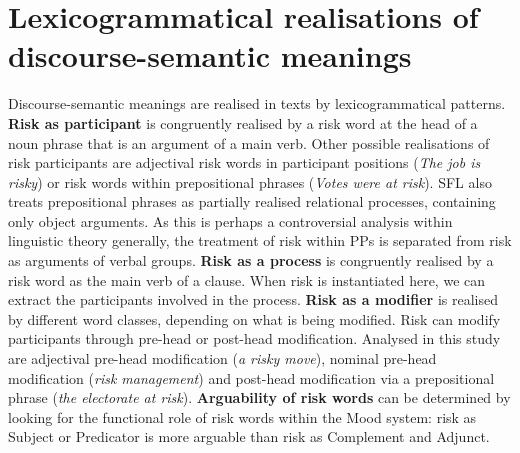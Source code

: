 		\section{Lexicogrammatical realisations of discourse-semantic meanings}

			Discourse-semantic meanings are realised in texts by lexicogrammatical patterns. \textbf{Risk as participant} is congruently realised by a risk word at the head of a noun phrase that is an argument of a main verb. Other possible realisations of risk participants are adjectival risk words in participant positions (\emph{The job is risky}) or risk words within prepositional phrases (\emph{Votes were at risk}). SFL also treats prepositional phrases as partially realised relational processes, containing only object arguments. As this is perhaps a controversial analysis within linguistic theory generally, the treatment of risk within PPs is separated from risk as arguments of verbal groups. \textbf{Risk as a process} is congruently realised by a risk word as the main verb of a clause. When risk is instantiated here, we can extract the participants involved in the process. \textbf{Risk as a modifier} is realised by different word classes, depending on what is being modified. Risk can modify participants through pre-head or post-head modification. Analysed in this study are adjectival pre-head modification (\emph{a risky move}), nominal pre-head modification (\emph{risk management}) and post-head modification via a prepositional phrase (\emph{the electorate at risk}). \textbf{Arguability of risk words} can be determined by looking for the functional role of risk words within the Mood system: risk as Subject or Predicator is more arguable than risk as Complement and Adjunct. 



